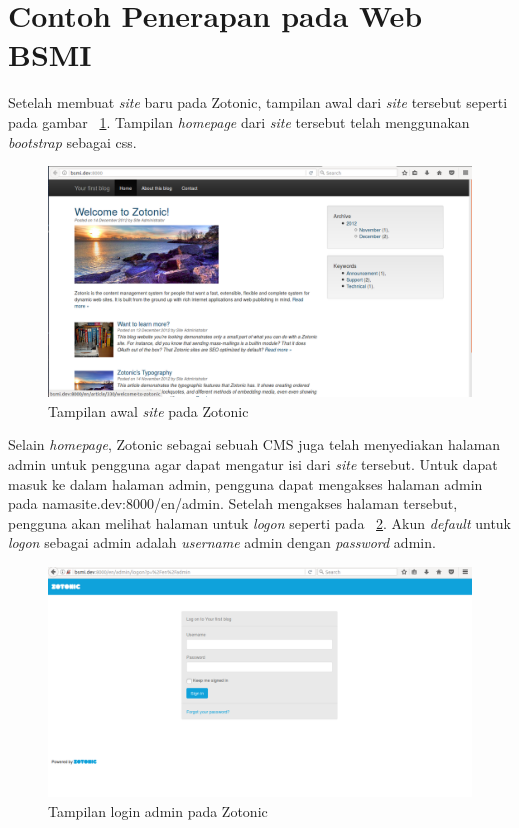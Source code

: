 \section{Contoh Penerapan pada Web BSMI}

Setelah membuat \textit{site} baru pada Zotonic, tampilan awal dari \textit{site} tersebut seperti pada gambar \pic~\ref{fig:home}. Tampilan \textit{homepage} dari \textit{site} tersebut telah menggunakan \textit{bootstrap} sebagai css.
\begin{figure}
	\centering
	\includegraphics[width=1\textwidth]
	{pics/1-home.png}
	\caption{Tampilan awal \textit{site} pada Zotonic}
	\label{fig:home}
\end{figure}
\vspace{-0.3cm}

Selain \textit{homepage}, Zotonic sebagai sebuah CMS juga telah menyediakan halaman admin untuk pengguna agar dapat mengatur isi dari \textit{site} tersebut. Untuk dapat masuk ke dalam halaman admin, pengguna dapat mengakses halaman admin pada namasite.dev:8000/en/admin. Setelah mengakses halaman tersebut, pengguna akan melihat halaman untuk \textit{logon} seperti pada \pic~\ref{fig:logon}. Akun \textit{default} untuk \textit{logon} sebagai admin adalah \textit{username} admin dengan \textit{password} admin.
\begin{figure}
	\centering
	\includegraphics[width=1\textwidth]
	{pics/2-adminLogon.png}
	\caption{Tampilan login admin pada Zotonic}
	\label{fig:logon}
\end{figure}
\vspace{-0.3cm}

